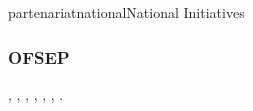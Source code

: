 \documentclass{ra2018}
\begin{document}
\begin{module}{partenariat}{national}{National Initiatives}
        
        
        
        \subsubsection{OFSEP}
        \begin{participants}    	
          ,
          , 	
          ,    	
          ,
          ,
          ,     
          .
        \end{participants}
         

\end{module}
\end{document}

